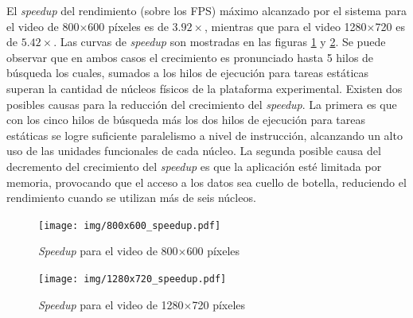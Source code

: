 El \emph{speedup} del rendimiento (sobre los FPS) máximo alcanzado por el
sistema para el video de 800$\times$600 píxeles es de $3.92\times$, mientras que
para el video 1280$\times$720 es de $5.42\times$. Las curvas de \emph{speedup}
son mostradas en las figuras \ref{speedUp800} y \ref{speedUp1280}. Se puede
observar que en ambos casos el crecimiento es pronunciado hasta 5 hilos de
búsqueda los cuales, sumados a los hilos de ejecución para tareas estáticas
superan la cantidad de núcleos físicos de la plataforma experimental. Existen
dos posibles causas para la reducción del crecimiento del \emph{speedup}. La
primera es que con los cinco hilos de búsqueda más los dos hilos de ejecución
para tareas estáticas se logre suficiente paralelismo a nivel de instrucción,
alcanzando un alto uso de las unidades funcionales de cada núcleo. La segunda
posible causa del decremento del crecimiento del \emph{speedup} es que la
aplicación esté limitada por memoria, provocando que el acceso a los datos sea
cuello de botella, reduciendo el rendimiento cuando se utilizan más de seis
núcleos.

\begin{figure}[h]

	\texttt{[image: img/800x600\_speedup.pdf]}
	\caption{\emph{Speedup} para el video de 800$\times$600 píxeles}
	\label{speedUp800}

\end{figure}

\begin{figure}[h]

	\texttt{[image: img/1280x720\_speedup.pdf]}
	\caption{\emph{Speedup} para el video de 1280$\times$720 píxeles}
	\label{speedUp1280}

\end{figure}
